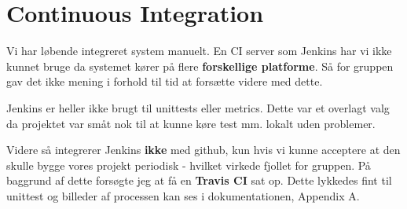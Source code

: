 \section{Continuous Integration}\label{sec:ci}

Vi har løbende integreret system manuelt. En CI server som Jenkins har vi ikke kunnet bruge da systemet kører på flere \textbf{forskellige platforme}. Så for gruppen gav det ikke mening i forhold til tid at forsætte videre med dette.

Jenkins er heller ikke brugt til unittests eller metrics. Dette var et overlagt valg da projektet var småt nok til at kunne køre test mm. lokalt uden problemer.

Videre så integrerer Jenkins \textbf{ikke} med github, kun hvis vi kunne acceptere at den skulle bygge vores projekt periodisk - hvilket virkede fjollet for gruppen. 
På baggrund af dette forsøgte jeg at få en \textbf{Travis CI} sat op. Dette lykkedes fint til unittest og billeder af processen kan ses i dokumentationen, Appendix A.